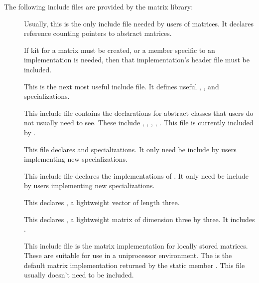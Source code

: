 The following include files are provided by the matrix library:

\begin{description}
\item[]
Usually, this is the only include file needed by users of matrices.  It
declares reference counting pointers to abstract matrices.

If kit for a matrix must be created, or a member specific to an
implementation is needed, then that implementation's header file must be
included.

\item[]
This is the next most useful include file.  It defines useful
, , and 
specializations.

\item[]
This include file contains the declarations for abstract classes that
users do not usually need to see.  These include ,
, , ,
.  This file is currently included by
.

\item[]
This file declares  and specializations.  It
only need be include by users implementing new 
specializations.

\item[]
This include file declares the implementations of
.  It only need be include by users implementing
new  specializations.

\item[]
This declares , a lightweight vector of length three.

\item[]
This declares , a lightweight matrix of dimension three by
three.  It includes .

\item[]
This include file is the matrix implementation for locally stored
matrices.  These are suitable for use in a uniprocessor environment.  The
 is the default matrix implementation returned
by the static member .
This file usually doesn't need to be included.


\end{description}
